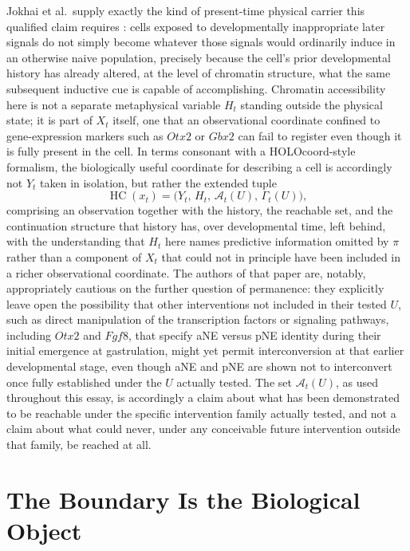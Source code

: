 \documentclass[11pt]{article}
\begin{document}
Jokhai et al.\ supply exactly the kind of present-time physical carrier this qualified claim requires \cite{jokhai2026}: cells exposed to developmentally inappropriate later signals do not simply become whatever those signals would ordinarily induce in an otherwise naive population, precisely because the cell's prior developmental history has already altered, at the level of chromatin structure, what the same subsequent inductive cue is capable of accomplishing. Chromatin accessibility here is not a separate metaphysical variable $H_t$ standing outside the physical state; it is part of $X_t$ itself, one that an observational coordinate confined to gene-expression markers such as $Otx2$ or $Gbx2$ can fail to register even though it is fully present in the cell. In terms consonant with a HOLOcoord-style formalism, the biologically useful coordinate for describing a cell is accordingly not $Y_t$ taken in isolation, but rather the extended tuple
\begin{equation}
\operatorname{HC}(x_t) = \bigl(Y_t,\, H_t,\, \mathcal{A}_t(U),\, \Gamma_t(U)\bigr),
\end{equation}
comprising an observation together with the history, the reachable set, and the continuation structure that history has, over developmental time, left behind, with the understanding that $H_t$ here names predictive information omitted by $\pi$ rather than a component of $X_t$ that could not in principle have been included in a richer observational coordinate. The authors of that paper are, notably, appropriately cautious on the further question of permanence: they explicitly leave open the possibility that other interventions not included in their tested $U$, such as direct manipulation of the transcription factors or signaling pathways, including $Otx2$ and $Fgf8$, that specify aNE versus pNE identity during their initial emergence at gastrulation, might yet permit interconversion at that earlier developmental stage, even though aNE and pNE are shown not to interconvert once fully established under the $U$ actually tested. The set $\mathcal{A}_t(U)$, as used throughout this essay, is accordingly a claim about what has been demonstrated to be reachable under the specific intervention family actually tested, and not a claim about what could never, under any conceivable future intervention outside that family, be reached at all.

\section{The Boundary Is the Biological Object}
\end{document}
